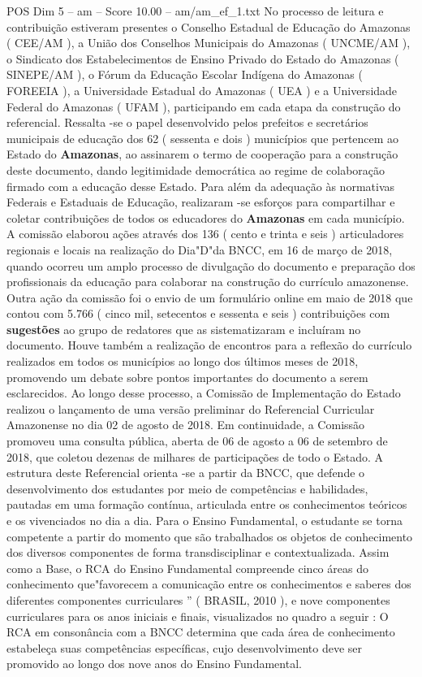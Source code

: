 \begin{textsample}{POS Dim 5 – am – Score 10.00 – am/am\_ef\_1.txt}
No processo de leitura e contribuição estiveram presentes o Conselho Estadual de Educação do Amazonas ( CEE/AM ), a União dos Conselhos Municipais do Amazonas ( UNCME/AM ), o Sindicato dos Estabelecimentos de Ensino Privado do Estado do Amazonas ( SINEPE/AM ), o Fórum da Educação Escolar Indígena do Amazonas ( FOREEIA ), a Universidade Estadual do Amazonas ( UEA ) e a Universidade Federal do Amazonas ( UFAM ), participando em cada etapa da construção do referencial.
Ressalta -se o papel desenvolvido pelos prefeitos e secretários municipais de educação dos 62 ( sessenta e dois ) municípios que pertencem ao Estado do \textbf{Amazonas}, ao assinarem o termo de cooperação para a construção deste documento, dando legitimidade democrática ao regime de colaboração firmado com a educação desse Estado.
Para além da adequação às normativas Federais e Estaduais de Educação, realizaram -se esforços para compartilhar e coletar contribuições de todos os educadores do \textbf{Amazonas} em cada município.
A comissão elaborou ações através dos 136 ( cento e trinta e seis ) articuladores regionais e locais na realização do Dia"D"da BNCC, em 16 de março de 2018, quando ocorreu um amplo processo de divulgação do documento e preparação dos profissionais da educação para colaborar na construção do currículo amazonense.
Outra ação da comissão foi o envio de um formulário online em maio de 2018 que contou com 5.766 ( cinco mil, setecentos e sessenta e seis ) contribuições com \textbf{sugestões} ao grupo de redatores que as sistematizaram e incluíram no documento.
Houve também a realização de encontros para a reflexão do currículo realizados em todos os municípios ao longo dos últimos meses de 2018, promovendo um debate sobre pontos importantes do documento a serem esclarecidos.
Ao longo desse processo, a Comissão de Implementação do Estado realizou o lançamento de uma versão preliminar do Referencial Curricular Amazonense no dia 02 de agosto de 2018.
Em continuidade, a Comissão promoveu uma consulta pública, aberta de 06 de agosto a 06 de setembro de 2018, que coletou dezenas de milhares de participações de todo o Estado.
A estrutura deste Referencial orienta -se a partir da BNCC, que defende o desenvolvimento dos estudantes por meio de competências e habilidades, pautadas em uma formação contínua, articulada entre os conhecimentos teóricos e os vivenciados no dia a dia.
Para o Ensino Fundamental, o estudante se torna competente a partir do momento que são trabalhados os objetos de conhecimento dos diversos componentes de forma transdisciplinar e contextualizada.
Assim como a Base, o RCA do Ensino Fundamental compreende cinco áreas do conhecimento que"favorecem a comunicação entre os conhecimentos e saberes dos diferentes componentes curriculares ” ( BRASIL, 2010 ), e nove componentes curriculares para os anos iniciais e finais, visualizados no quadro a seguir : O RCA em consonância com a BNCC determina que cada área de conhecimento estabeleça suas competências específicas, cujo desenvolvimento deve ser promovido ao longo dos nove anos do Ensino Fundamental.

\end{textsample}
